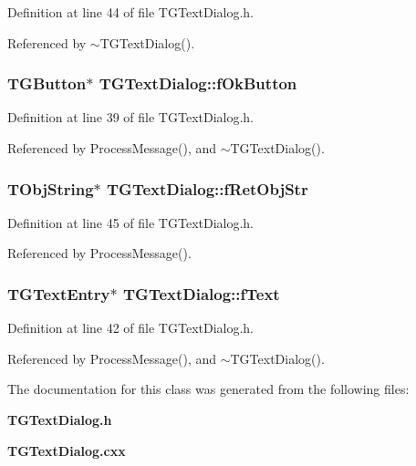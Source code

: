 Definition at line 44 of file TGTextDialog.h.



Referenced by $\sim$TGTextDialog().

\subsubsection[{fOkButton}]{\setlength{\rightskip}{0pt plus 5cm}TGButton$\ast$ {\bf TGTextDialog::fOkButton}\hspace{0.3cm}{\ttfamily  [protected]}}\label{classTGTextDialog_addb9aa1dfffbbdf7b0116568b75e31ba}


Definition at line 39 of file TGTextDialog.h.



Referenced by ProcessMessage(), and $\sim$TGTextDialog().

\subsubsection[{fRetObjStr}]{\setlength{\rightskip}{0pt plus 5cm}TObjString$\ast$ {\bf TGTextDialog::fRetObjStr}\hspace{0.3cm}{\ttfamily  [protected]}}\label{classTGTextDialog_a231d80c89f231d5948f418b5f0b8d9d7}


Definition at line 45 of file TGTextDialog.h.



Referenced by ProcessMessage().

\subsubsection[{fText}]{\setlength{\rightskip}{0pt plus 5cm}TGTextEntry$\ast$ {\bf TGTextDialog::fText}\hspace{0.3cm}{\ttfamily  [protected]}}\label{classTGTextDialog_af57e9948a5b6cf5d6db6322b16383a01}


Definition at line 42 of file TGTextDialog.h.



Referenced by ProcessMessage(), and $\sim$TGTextDialog().



The documentation for this class was generated from the following files:\begin{DoxyCompactItemize}
\item 
{\bf TGTextDialog.h}\item 
{\bf TGTextDialog.cxx}\end{DoxyCompactItemize}

